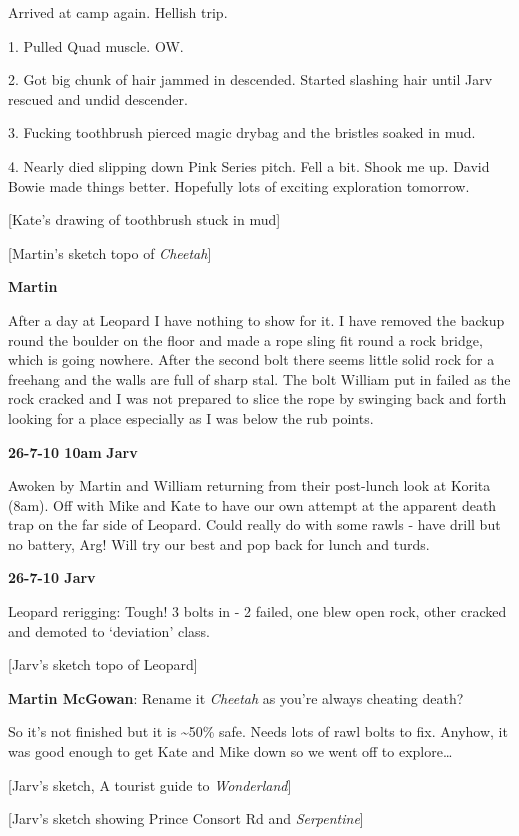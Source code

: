 Arrived at camp again. Hellish trip.

1. Pulled Quad muscle. OW.

2. Got big chunk of hair jammed in descended. Started slashing hair
until Jarv rescued and undid descender.

3. Fucking toothbrush pierced magic drybag and the bristles soaked in
mud.

4. Nearly died slipping down Pink Series pitch. Fell a bit. Shook me up.
David Bowie made things better. Hopefully lots of exciting exploration
tomorrow.

{[}Kate's drawing of toothbrush stuck in mud{]}

{[}Martin's sketch topo of \emph{Cheetah}{]}

\textbf{Martin}

After a day at Leopard I have nothing to show for it. I have removed the
backup round the boulder on the floor and made a rope sling fit round a
rock bridge, which is going nowhere. After the second bolt there seems
little solid rock for a freehang and the walls are full of sharp stal.
The bolt William put in failed as the rock cracked and I was not
prepared to slice the rope by swinging back and forth looking for a
place especially as I was below the rub points.

\textbf{26-7-10 10am} \textbf{Jarv}

Awoken by Martin and William returning from their post-lunch look at
Korita (8am). Off with Mike and Kate to have our own attempt at the
apparent death trap on the far side of Leopard. Could really do with
some rawls - have drill but no battery, Arg! Will try our best and pop
back for lunch and turds.

\textbf{26-7-10 Jarv}

Leopard rerigging: Tough! 3 bolts in - 2 failed, one blew open rock,
other cracked and demoted to `deviation' class.

{[}Jarv's sketch topo of Leopard{]}

\textbf{Martin McGowan}: Rename it \emph{Cheetah} as you're always
cheating death?

So it's not finished but it is \textasciitilde 50\% safe. Needs lots of
rawl bolts to fix. Anyhow, it was good enough to get Kate and Mike down
so we went off to explore\ldots{}

{[}Jarv's sketch, A tourist guide to \emph{Wonderland}{]}

{[}Jarv's sketch showing Prince Consort Rd and \emph{Serpentine}{]}

